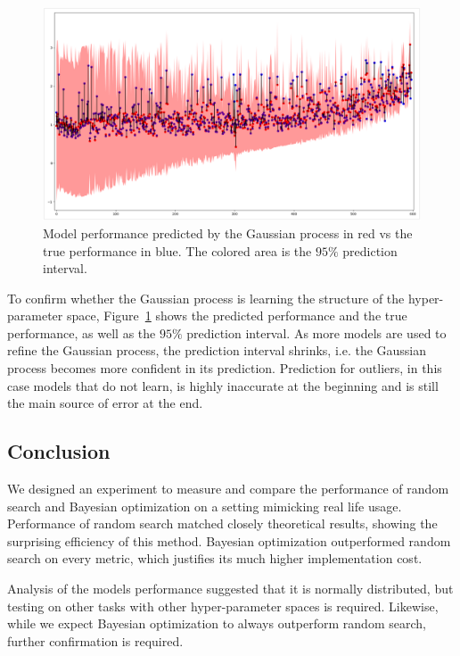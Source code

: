 \begin{figure}[htb]
	\centering
	\includegraphics[width=\linewidth]{img_hyperopt/bo_error_time.png}
	\caption[Model performance predicted by the Gaussian process vs the true performance]{Model performance predicted by the Gaussian process in red vs the true performance in blue. The colored area is the $95 \%$ prediction interval.}
	\label{fig:bo_error_time}
\end{figure}

To confirm whether the Gaussian process is learning the structure of the hyper-parameter space, Figure~\ref{fig:bo_error_time} shows the predicted performance and the true performance, as well as the $95 \%$ prediction interval. As more models are used to refine the Gaussian process, the prediction interval shrinks, i.e. the Gaussian process becomes more confident in its prediction. Prediction for outliers, in this case models that do not learn, is highly inaccurate at the beginning and is still the main source of error at the end.

\subsection{Conclusion}

We designed an experiment to measure and compare the performance of random search and Bayesian optimization on a setting mimicking real life usage. Performance of random search matched closely theoretical results, showing the surprising efficiency of this method. Bayesian optimization outperformed random search on every metric, which justifies its much higher implementation cost.

Analysis of the models performance suggested that it is normally distributed, but testing on other tasks with other hyper-parameter spaces is required. Likewise, while we expect Bayesian optimization to always outperform random search, further confirmation is required.

